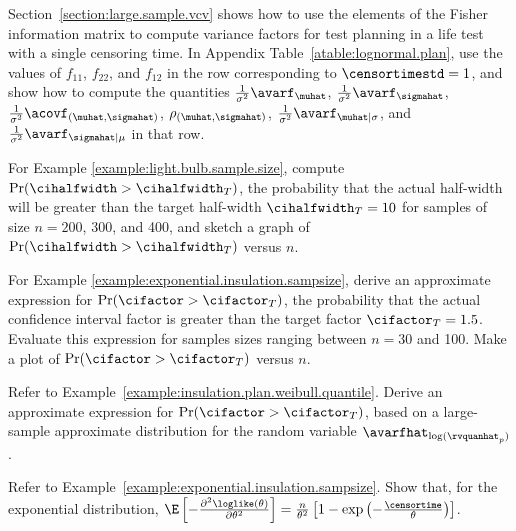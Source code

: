 \begin{exercise1}
Section~\ref{section:large.sample.vcv} shows how to use the elements
of the Fisher information matrix to compute variance factors for test
planning in a life test with a single censoring time.  In Appendix
Table~\ref{atable:lognormal.plan}, use the values of $f_{11}$,
$f_{22}$, and $f_{12}$ in the row corresponding to $\censortimestd=1$,
and show how to compute the quantities
$\frac{1}{\sigma^{2}}\avarf_{\muhat}$,
$\frac{1}{\sigma^{2}}\avarf_{\sigmahat}$,
$\frac{1}{\sigma^{2}}\acovf_{(\muhat, \sigmahat)}$, $\rho_{(\muhat,
\sigmahat)}$, $\frac{1}{\sigma^{2}}\avarf_{\muhat|\sigma}$, 
and $\frac{1}{\sigma^{2}}\avarf_{\sigmahat|\mu}$
in that row.
\end{exercise1}

\begin{exercise1}
For Example \ref{example:light.bulb.sample.size}, compute 
$\Pr(\cihalfwidth>\cihalfwidth_{T})$, 
the probability that the actual half-width will
be greater than the target half-width $\cihalfwidth_{T}=10$
for samples of size $n=200$, 300, and 400,
and sketch a graph of $\Pr(\cihalfwidth>\cihalfwidth_{T})$ versus $n$.
\end{exercise1}

\begin{exercise1}
For Example \ref{example:exponential.insulation.sampsize}, derive an
approximate expression for $\Pr(\cifactor>\cifactor_{T})$, the
probability that the actual confidence interval factor is greater than
the target factor $\cifactor_{T}=1.5$. Evaluate this expression for
samples sizes ranging between $n=30$ and 100.  Make a plot of
$\Pr(\cifactor>\cifactor_{T})$ versus $n$.
\end{exercise1}

\begin{exercise1}
Refer to Example~\ref{example:insulation.plan.weibull.quantile}.
Derive an approximate expression for 
$\Pr(\cifactor>\cifactor_{T})$, based on a
large-sample approximate distribution for the
random variable $\avarfhat_{\log({\rvquanhat_{p}})}$.
\end{exercise1}

\begin{exercise1}
Refer to Example~\ref{example:exponential.insulation.sampsize}.  Show
that, for the exponential distribution, $\E \left
[-\frac{\partial^{2}\loglike(\theta)}{\partial 	\theta^{2}}
\right]=  \frac{n}{\theta^{2}} \left[  1-\exp\left
(-\frac{\censortime}{\theta}\right ) \right ]$.
\end{exercise1}

